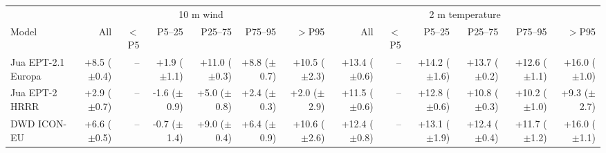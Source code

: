 \begin{tabular}{lrrrrrrrrrrrr}
\toprule
& \multicolumn{6}{c}{10 m wind} & \multicolumn{6}{c}{2 m temperature} \\
\cmidrule(lr){2-7} \cmidrule(lr){8-13}
Model & All & $<$P5 & P5--25 & P25--75 & P75--95 & $>$P95 & All & $<$P5 & P5--25 & P25--75 & P75--95 & $>$P95 \\
\midrule
Jua EPT-2.1 Europa & +8.5 ($\pm$0.4) & -- & +1.9 ($\pm$1.1) & +11.0 ($\pm$0.3) & +8.8 ($\pm$0.7) & +10.5 ($\pm$2.3) & +13.4 ($\pm$0.6) & -- & +14.2 ($\pm$1.6) & +13.7 ($\pm$0.2) & +12.6 ($\pm$1.1) & +16.0 ($\pm$1.0) \\
Jua EPT-2 HRRR & +2.9 ($\pm$0.7) & -- & -1.6 ($\pm$0.9) & +5.0 ($\pm$0.8) & +2.4 ($\pm$0.3) & +2.0 ($\pm$2.9) & +11.5 ($\pm$0.6) & -- & +12.8 ($\pm$0.6) & +10.8 ($\pm$0.3) & +10.2 ($\pm$1.0) & +9.3 ($\pm$2.7) \\
DWD ICON-EU & +6.6 ($\pm$0.5) & -- & -0.7 ($\pm$1.4) & +9.0 ($\pm$0.4) & +6.4 ($\pm$0.9) & +10.6 ($\pm$2.6) & +12.4 ($\pm$0.8) & -- & +13.1 ($\pm$1.9) & +12.4 ($\pm$0.4) & +11.7 ($\pm$1.2) & +16.0 ($\pm$1.1) \\
\bottomrule
\end{tabular}
